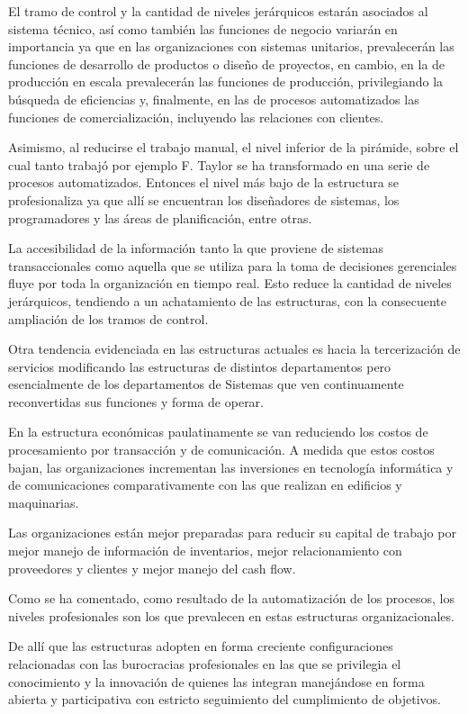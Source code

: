 \documentclass[a4paper, 12pt]{article}
\begin{document}
El tramo de control y la cantidad de niveles jerárquicos estarán asociados al sistema técnico, así como también las funciones de negocio variarán en importancia ya que en las organizaciones con sistemas unitarios, prevalecerán las funciones de desarrollo de productos o diseño de proyectos, en cambio, en la de producción en escala prevalecerán las funciones de producción, privilegiando la búsqueda de eficiencias y, finalmente, en las de procesos automatizados las funciones de comercialización, incluyendo las relaciones con clientes.

Asimismo, al reducirse el trabajo manual, el nivel inferior de la pirámide, sobre el cual tanto trabajó por ejemplo F. Taylor se ha transformado en una serie de procesos automatizados. Entonces el nivel más bajo de la estructura se profesionaliza ya que allí se encuentran los diseñadores de sistemas, los programadores y las áreas de planificación, entre otras.

La accesibilidad de la información tanto la que proviene de sistemas transaccionales como aquella que se utiliza para la toma de decisiones gerenciales fluye por toda la organización en tiempo real. Esto reduce la cantidad de niveles jerárquicos, tendiendo a un achatamiento de las estructuras, con la consecuente ampliación de los tramos de control.

Otra tendencia evidenciada en las estructuras actuales es hacia la tercerización de servicios modificando las estructuras de distintos departamentos pero esencialmente de los departamentos de Sistemas que ven continuamente reconvertidas sus funciones y forma de operar.

En la estructura económicas paulatinamente se van reduciendo los costos de procesamiento por transacción y de comunicación. A medida que estos costos bajan, las organizaciones incrementan las inversiones en tecnología informática y de comunicaciones comparativamente con las que realizan en edificios y maquinarias. 

Las organizaciones están mejor preparadas para reducir su capital de trabajo por mejor manejo de información de inventarios, mejor relacionamiento con proveedores y clientes y mejor manejo del cash flow.

Como se ha comentado, como resultado de la automatización de los procesos, los niveles profesionales son los que prevalecen en estas estructuras organizacionales.

De allí que las estructuras adopten en forma creciente configuraciones relacionadas con las burocracias profesionales en las que se privilegia el conocimiento y la innovación de quienes las integran manejándose en forma abierta y participativa con estricto seguimiento del cumplimiento de objetivos.
\end{document}

